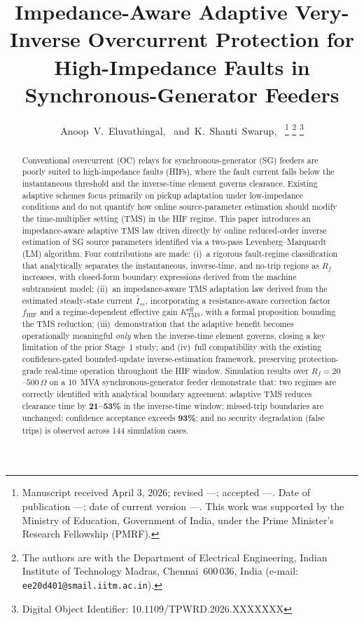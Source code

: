 \documentclass[10pt,journal,twoside]{IEEEtran}
\title{Impedance-Aware Adaptive Very-Inverse Overcurrent Protection
       for High-Impedance Faults in Synchronous-Generator Feeders}
\author{Anoop~V.~Eluvathingal,~\IEEEmembership{Student Member,~IEEE,}
        and~K.~Shanti~Swarup,~\IEEEmembership{Senior Member,~IEEE}%
\thanks{Manuscript received April 3, 2026; revised ---; accepted ---.
        Date of publication ---; date of current version ---.
        This work was supported by the Ministry of Education, Government
        of India, under the Prime Minister's Research Fellowship (PMRF).}%
\thanks{The authors are with the Department of Electrical Engineering,
        Indian Institute of Technology Madras, Chennai~600\,036, India
        (e-mail: \texttt{ee20d401@smail.iitm.ac.in}).}%
\thanks{Digital Object Identifier: 10.1109/TPWRD.2026.XXXXXXX}}
\newcommand{\Rf}{R_{\!f}}
\newcommand{\Iss}{\hat{I}_{ss}}
\newcommand{\fhif}{f_{\mathrm{HIF}}}
\newcommand{\Keff}{K_{\mathrm{TMS}}^{\mathrm{eff}}}
\begin{document}

\maketitle

\begin{abstract}
Conventional overcurrent (OC) relays for synchronous-generator (SG) feeders
are poorly suited to high-impedance faults (HIFs), where the fault current
falls below the instantaneous threshold and the inverse-time element governs
clearance.  Existing adaptive schemes focus primarily on pickup adaptation
under low-impedance conditions and do not quantify how online source-parameter
estimation should modify the time-multiplier setting (TMS) in the HIF regime.
This paper introduces an impedance-aware adaptive TMS law driven directly by
online reduced-order inverse estimation of SG source parameters identified via
a two-pass Levenberg--Marquardt (LM) algorithm.  Four contributions are made:
(i)~a rigorous fault-regime classification that analytically separates the
instantaneous, inverse-time, and no-trip regions as $\Rf$ increases, with
closed-form boundary expressions derived from the machine subtransient model;
(ii)~an impedance-aware TMS adaptation law derived from the estimated
steady-state current $\Iss$, incorporating a resistance-aware correction factor
$\fhif$ and a regime-dependent effective gain $\Keff$, with a formal
proposition bounding the TMS reduction; (iii)~demonstration that the adaptive
benefit becomes operationally meaningful \emph{only} when the inverse-time
element governs, closing a key limitation of the prior Stage~1 study; and
(iv)~full compatibility with the existing confidence-gated bounded-update
inverse-estimation framework, preserving protection-grade real-time operation
throughout the HIF window.
Simulation results over $\Rf = 20$--$500\,\Omega$ on a 10~MVA
synchronous-generator feeder demonstrate that: two regimes are correctly
identified with analytical boundary agreement; adaptive TMS reduces clearance
time by \textbf{21--53\%} in the inverse-time window; missed-trip boundaries
are unchanged; confidence acceptance exceeds \textbf{93\%}; and no security
degradation (false trips) is observed across 144 simulation cases.
\end{abstract}
\end{document}
